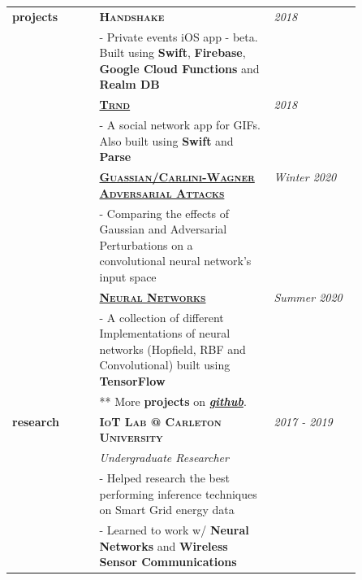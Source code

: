 \documentclass{article}
\begin{document}
\begin{longtable}{@{}>{\raggedleft}p{0.25\linewidth}
                          p{}>{}p{0.25\linewidth}@{}}
        \textbf{projects}
            & \textbf{\textsc{Handshake} } & \textit{2018} \\
            & - Private events iOS app - beta. Built using \textbf{Swift}, \textbf{Firebase}, \textbf{Google Cloud Functions} and \textbf{Realm DB}\\ [2em]

            & \textbf{\textsc{\href{https://github.com/kareemarab/trnd}{\textbf{Trnd}}}} & \textit{2018} \\
            & - A social network app for GIFs. Also built using \textbf{Swift} and \textbf{Parse} \\ [1em]

            & \textbf{\textsc{\href{https://github.com/kareemarab/advatck}{\textbf{Guassian/Carlini-Wagner Adversarial Attacks}}}}\ & \textit{Winter 2020} \\
            & - Comparing the effects of Gaussian and Adversarial Perturbations on a convolutional neural network's input space \\ [2em]

            & \textbf{\textsc{\href{https://github.com/kareemarab/neuralnets}{\textbf{Neural Networks}}}} & \textit{Summer 2020} \\
            & - A collection of different Implementations of neural networks (Hopfield, RBF and Convolutional) built using \textbf{TensorFlow} \\ [2em]


            & ** More \textbf{projects} on \textit{\href{https://github.com/kareemarab}{\textbf{github}}}.\\ [1em]

        \textbf{research}
            & \textbf{\textsc{IoT Lab @ Carleton University}} & \textit{2017 - 2019} \\
            & \textit{Undergraduate Researcher} \\
            & - Helped research the best performing inference techniques on Smart Grid energy data \\
            & - Learned to work w/ \textbf{Neural Networks} and \textbf{Wireless Sensor Communications} \\ [1em]


\end{longtable}
\end{document}

